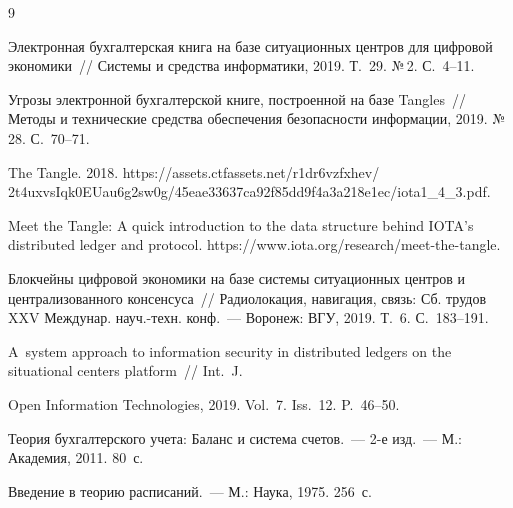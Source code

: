        {\small\frenchspacing


        {%




        \begin{thebibliography}{9}




  Электронная бухгалтерская книга на базе ситуационных центров для цифровой экономики~/\!\!/ Системы и средства информатики, 2019. Т.~29. №\,2. С.~4--11.




 Угрозы электронной бухгалтерской книге, построенной на базе Tangles~/\!\!/ Методы и технические средства обеспечения безопасности информации, 2019. №\,28. С.~70--71.




 The Tangle. 2018. {\sf https://assets.ctfassets.net/r1dr6vzfxhev/ 2t4uxvsIqk0EUau6g2sw0g/45eae33637ca92f85dd9f4a3a218e1ec/iota1\_4\_3.pdf}.




Meet the Tangle: A quick introduction to the data structure behind IOTA's distributed ledger and protocol. {\sf https://www.iota.org/research/meet-the-tangle}.




 Блокчейны цифровой экономики на базе системы ситуационных центров и централизованного консенсуса~/\!\!/ Радиолокация, навигация, связь: Сб. трудов XXV Междунар. науч.-техн. конф.~--- Воронеж: ВГУ, 2019. Т.~6. С.~183--191.




 A~system approach to information security in distributed ledgers on the situational centers platform~/\!\!/ Int.~J.


Open Information Technologies, 2019. Vol.~7. Iss.~12. P.~46--50.




 Теория бухгалтерского учета: Баланс и система счетов.~---  2-е изд.~--- М.: Академия, 2011. 80~с.




 Введение в теорию расписаний.~--- М.: Наука, 1975. 256~с. 





        \end{thebibliography}


        } }


